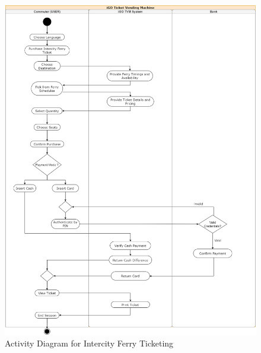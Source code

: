 \documentclass[letterpaper]{report}
\begin{document}
\begin{figure}[ht]
    \centering
    \includegraphics[width=\textwidth,
    height=0.735
    \textheight, keepaspectratio]{ActivityDiagrams/AD - 2.png}
    \caption{Activity Diagram for Intercity Ferry Ticketing}
    \label{fig:ActivityDiagram_Intercity}
\end{figure}
\clearpage
\end{document}
